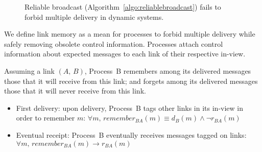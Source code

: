 \begin{figure*}
  \begin{center}
    \hspace{30pt}
    \hspace{30pt}
    \hspace{30pt}
    \caption{\label{fig:memorylinkfails}Reliable broadcast
      (Algorithm~\ref{algo:reliablebroadcast}) fails to forbid multiple delivery
      in dynamic systems. }
  \end{center}
\end{figure*}



We define link memory as a mean for processes to forbid multiple delivery while
safely removing obsolete control information. Processes attach control
information about expected messages to each link of their respective in-view.


\begin{definition}
  Assuming a link $(A,\, B)$, Process~B remembers among its delivered messages
  those that it will receive from this link; and forgets among its delivered
  messages those that it will never receive from this link.
  \begin{itemize}
  \item \small First delivery: upon delivery, Process~B tags other links in its
    in-view in order to remember $m$:
    $\forall m,\, remember_{BA}(m) \equiv d_B(m) \wedge \neg r_{BA}(m)$
  \item Eventual receipt: Process~B eventually receives messages tagged on links:
    $\forall m,\, remember_{BA}(m) \rightarrow r_{BA}(m)$
  \end{itemize}
\end{definition}

